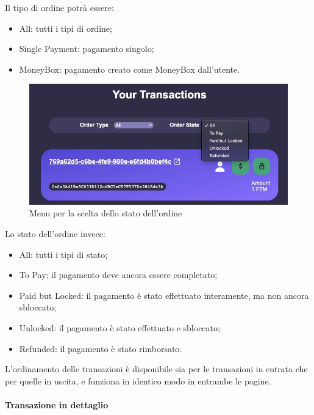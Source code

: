                 Il tipo di ordine potrà essere:
                \begin{itemize}
                    \item All: tutti i tipi di ordine;
                    \item Single Payment: pagamento singolo;
                    \item MoneyBox: pagamento creato come MoneyBox dall'utente.
                \end{itemize}

                \begin{figure}[H]
                    \centering
                    \includegraphics[scale=0.4]{immagini/Transaction/orderstate.jpg}
                    \caption{Menu per la scelta dello stato dell'ordine}
                \end{figure}

                Lo stato dell'ordine invece:
                \begin{itemize}
                \item All: tutti i tipi di stato;
                    \item To Pay: il pagamento deve ancora essere completato;
                    \item Paid but Locked: il pagamento è stato effettuato interamente, ma non ancora sbloccato;
                    \item Unlocked: il pagamento è stato effettuato e sbloccato;
                    \item Refunded: il pagamento è stato rimborsato.
                \end{itemize}

                L'ordinamento delle transazioni è disponibile sia per le transazioni in entrata che per quelle in uscita, e funziona in identico modo in entrambe le pagine.

                \paragraph{Transazione in dettaglio}

